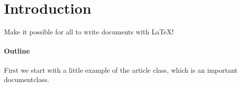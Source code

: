 \section{Introduction}
Make it possible for all to write documents with \LaTeX{}!

\paragraph{Outline}
First we start with a little example of the article class, which is an 
important documentclass. 